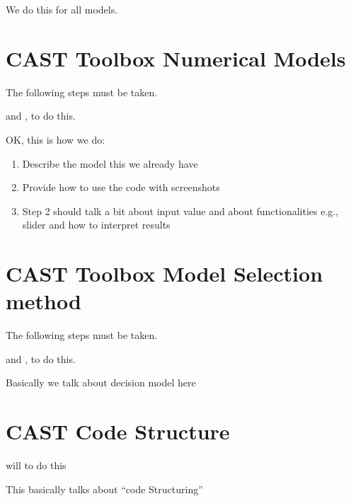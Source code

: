 \documentclass[letterpaper,10pt,english]{sphinxmanual}
\begin{document}
\sphinxAtStartPar
We do this for all models.


\chapter{CAST Toolbox \sphinxhyphen{} Numerical Models}
\label{\detokenize{contents/toolbox/num_model:cast-toolbox-numerical-models}}\label{\detokenize{contents/toolbox/num_model::doc}}
\sphinxAtStartPar
The following steps must be taken.

\sphinxAtStartPar
{} and , to do this.

\sphinxAtStartPar
OK, this is how we do:
\begin{enumerate}
%
\item {} 
\sphinxAtStartPar
Describe the model \sphinxhyphen{} this we already have

\item {} 
\sphinxAtStartPar
Provide how to use the code with screenshots

\item {} 
\sphinxAtStartPar
Step 2 should talk a bit about input value and about functionalities \sphinxhyphen{} e.g., slider and how to interpret results

\end{enumerate}


\chapter{CAST Toolbox \sphinxhyphen{} Model Selection method}
\label{\detokenize{contents/toolbox/mod_sel:cast-toolbox-model-selection-method}}\label{\detokenize{contents/toolbox/mod_sel::doc}}
\sphinxAtStartPar
The following steps must be taken.

\sphinxAtStartPar
{} and  , to do this.

\sphinxAtStartPar
Basically we talk about decision model here


\chapter{CAST Code Structure}
\label{\detokenize{contents/develop/code_structure:cast-code-structure}}\label{\detokenize{contents/develop/code_structure::doc}}
\sphinxAtStartPar
{} will to do this

\sphinxAtStartPar
This basically talks about “code Structuring”
\end{document}

